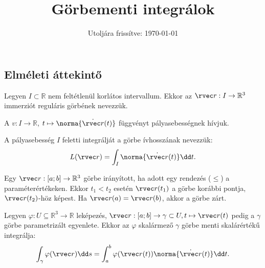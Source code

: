 \documentclass[a4paper, 12pt]{scrartcl}
\title{Görbementi integrálok}
\date{Utoljára frissítve: \today}
\begin{document}
\allowdisplaybreaks

\maketitle

\subsection{Elméleti áttekintő}

\begin{definition}
  Legyen $I \subset \mathbb R$ nem feltétlenül korlátos intervallum. Ekkor az
  $\rvec r : I \rightarrow \mathbb R^3$ immerziót reguláris görbének nevezzük.
\end{definition}

\begin{definition}
  A $v: I \rightarrow \mathbb R$, $t \mapsto \norma{\dot{\rvec r}(t)}$
  függvényt pályasebességnek hívjuk.

  A pályasebesség $I$ feletti integrálját a görbe ívhosszának nevezzük:
  $$
    L(\rvec r) = \int_I \norma{\dot{\rvec r}(t)} \dd t
    \text.
  $$
\end{definition}

\begin{definition}
  Egy $\rvec r: [a;b] \rightarrow \mathbb R^3$ görbe irányított, ha adott egy
  rendezés ($\leq$) a paraméterértékeken. Ekkor $t_1 < t_2$ esetén
  $\rvec r(t_1)$ a görbe korábbi pontja, $\rvec r(t_2)$-höz képest. Ha
  $\rvec r(a) = \rvec r(b)$, akkor a görbe zárt.
\end{definition}

\begin{definition}
  Legyen $\varphi: U \subseteq \mathbb R^3 \rightarrow \mathbb R$ leképezés,
  $\rvec r: [a;b] \rightarrow \gamma \subset U, t \mapsto \rvec r(t)$ pedig a
  $\gamma$ görbe parametrizált egyenlete. Ekkor az $\varphi$ skalármező $\gamma$
  görbe menti skalárértékű integrálja:
  $$
    \int_\gamma \varphi(\rvec r) \dd s =
    \int_a^b \varphi(\rvec r(t)) \norma{\dot{\rvec r}(t)} \dd t
    \text.
  $$
\end{definition}
\end{document}
